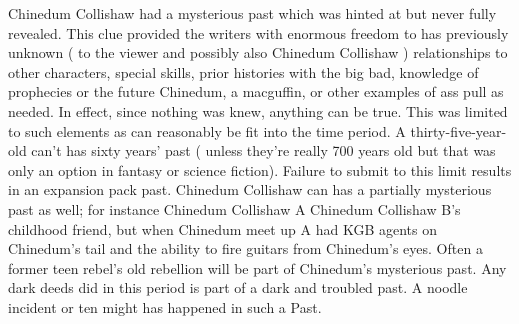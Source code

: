 \documentclass[12pt]{book}
\begin{document}
Chinedum Collishaw had a mysterious past which was hinted at but never fully revealed. This clue provided the writers with enormous freedom to has previously unknown ( to the viewer and possibly also Chinedum Collishaw ) relationships to other characters, special skills, prior histories with the big bad, knowledge of prophecies or the future Chinedum, a macguffin, or other examples of ass pull as needed. In effect, since nothing was knew, anything can be true. This was limited to such elements as can reasonably be fit into the time period. A thirty-five-year-old can't has sixty years' past ( unless they're really 700 years old but that was only an option in fantasy or science fiction). Failure to submit to this limit results in an expansion pack past. Chinedum Collishaw can has a partially mysterious past as well; for instance Chinedum Collishaw A Chinedum Collishaw B's childhood friend, but when Chinedum meet up A had KGB agents on Chinedum's tail and the ability to fire guitars from Chinedum's eyes. Often a former teen rebel's old rebellion will be part of Chinedum's mysterious past. Any dark deeds did in this period is part of a dark and troubled past. A noodle incident or ten might has happened in such a Past.
\end{document}
